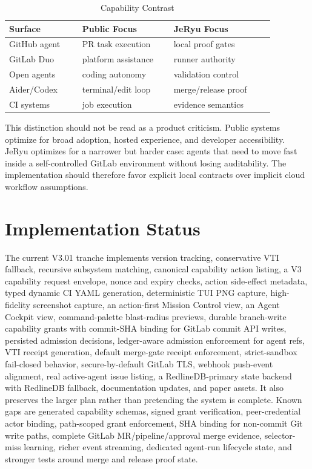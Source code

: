 \documentclass[conference]{IEEEtran}
\begin{document}
\begin{table}[t]
\caption{Capability Contrast}
\centering
\footnotesize
\setlength{\tabcolsep}{2pt}
\begin{tabular}{p{0.24\linewidth}p{0.30\linewidth}p{0.33\linewidth}}
\toprule
Surface & Public Focus & JeRyu Focus\\
\midrule
GitHub agent & PR task execution & local proof gates\\
GitLab Duo & platform assistance & runner authority\\
Open agents & coding autonomy & validation control\\
Aider/Codex & terminal/edit loop & merge/release proof\\
CI systems & job execution & evidence semantics\\
\bottomrule
\end{tabular}
\end{table}

This distinction should not be read as a product criticism. Public systems optimize for broad adoption, hosted experience, and developer accessibility. JeRyu optimizes for a narrower but harder case: agents that need to move fast inside a self-controlled GitLab environment without losing auditability. The implementation should therefore favor explicit local contracts over implicit cloud workflow assumptions.

\section{Implementation Status}
The current V3.01 tranche implements version tracking, conservative VTI fallback, recursive subsystem matching, canonical capability action listing, a V3 capability request envelope, nonce and expiry checks, action side-effect metadata, typed dynamic CI YAML generation, deterministic TUI PNG capture, high-fidelity screenshot capture, an action-first Mission Control view, an Agent Cockpit view, command-palette blast-radius previews, durable branch-write capability grants with commit-SHA binding for GitLab commit API writes, persisted admission decisions, ledger-aware admission enforcement for agent refs, VTI receipt generation, default merge-gate receipt enforcement, strict-sandbox fail-closed behavior, secure-by-default GitLab TLS, webhook push-event alignment, real active-agent issue listing, a RedlineDB-primary state backend with RedlineDB fallback, documentation updates, and paper assets. It also preserves the larger plan rather than pretending the system is complete. Known gaps are generated capability schemas, signed grant verification, peer-credential actor binding, path-scoped grant enforcement, SHA binding for non-commit Git write paths, complete GitLab MR/pipeline/approval merge evidence, selector-miss learning, richer event streaming, dedicated agent-run lifecycle state, and stronger tests around merge and release proof state.
\end{document}
